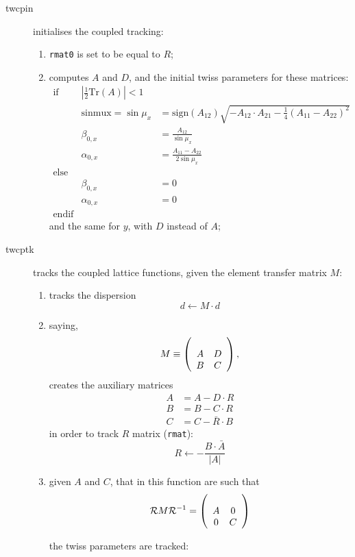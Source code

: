 \documentclass{cern-art} %
\renewcommand{\L}[1]{\lstinline[firstnumber=last]{#1}}
\begin{document}
\begin{description}
\item[twcpin] initialises the coupled tracking:
\\\begin{enumerate}
\item \L{rmat0} is set to be equal to $R$;
\item computes $A$ and $D$, and the initial twiss parameters for these matrices:
\[
\begin{array}{ccl}
\text{if} & \left|\frac{1}{2}\mathrm{Tr}\left(A\right)\right|<1\\
 & \mathrm{sinmux}=\sin\mu_{x} & =\mathrm{sign}\left(A_{12}\right)\sqrt{-A_{12}\cdot A_{21}-\frac{1}{4}\left(A_{11}-A_{22}\right)^{2}}\\
 & \beta_{0,x} & =\frac{A_{12}}{\sin\mu_{x}}\\
 & \alpha_{0,x} & =\frac{A_{11}-A_{22}}{2\sin\mu_{x}}\\
\text{else}\\
 & \beta_{0,x} & =0\\
 & \alpha_{0,x} & =0\\
\text{endif}
\end{array}
\]
and the same for $y$, with $D$ instead of $A$;
\end{enumerate}
\item[twcptk] tracks the coupled lattice functions, given the element transfer matrix $M$:
\begin{enumerate}
\item tracks the dispersion $$d \leftarrow M\cdot d$$
\item saying, 
$$M\equiv\left(\begin{array}[t]{cc}
A & D\\
B & C
\end{array}\right),$$
creates the auxiliary matrices
\[
\begin{aligned}A & =A-D\cdot R\\
B & =B-C\cdot R\\
C & =C-\bar{R}\cdot B
\end{aligned}
\]
in order to track $R$ matrix (\L{rmat}):
\[
R\leftarrow-\frac{B\cdot\bar{A}}{\left|A\right|}
\]
\item given $A$ and $C$, that in this function are such that
\[\mathcal{R}M\mathcal{R}^{-1}=\left(\begin{array}[t]{cc}
A & 0\\
0 & C
\end{array} \right) \]

the twiss parameters are tracked:
\end{enumerate}
\end{description}
\end{document}
